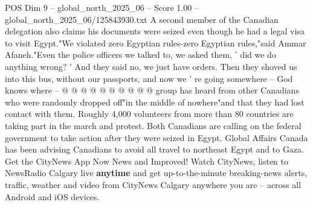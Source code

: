 \begin{textsample}{POS Dim 9 – global\_north\_2025\_06 – Score 1.00 – global\_north\_2025\_06/125843930.txt}
A second member of the Canadian delegation also claims his documents were seized even though he had a legal visa to visit Egypt."We violated zero Egyptian rules-zero Egyptian rules,"said Ammar Afaneh."Even the police officers we talked to, we asked them, ' did we do anything wrong? ' And they said no, we just have orders.
Then they shoved us into this bus, without our passports, and now we ' re going somewhere -- God knows where -- @ @ @ @ @ @ @ @ @ @ group has heard from other Canadians who were randomly dropped off"in the middle of nowhere"and that they had lost contact with them.
Roughly 4,000 volunteers from more than 80 countries are taking part in the march and protest.
Both Canadians are calling on the federal government to take action after they were seized in Egypt.
Global Affairs Canada has been advising Canadians to avoid all travel to northeast Egypt and to Gaza.
Get the CityNews App Now News and Improved!
Watch CityNews, listen to NewsRadio Calgary live \textbf{anytime} and get up-to-the-minute breaking-news alerts, traffic, weather and video from CityNews Calgary anywhere you are -- across all Android and iOS devices.

\end{textsample}
